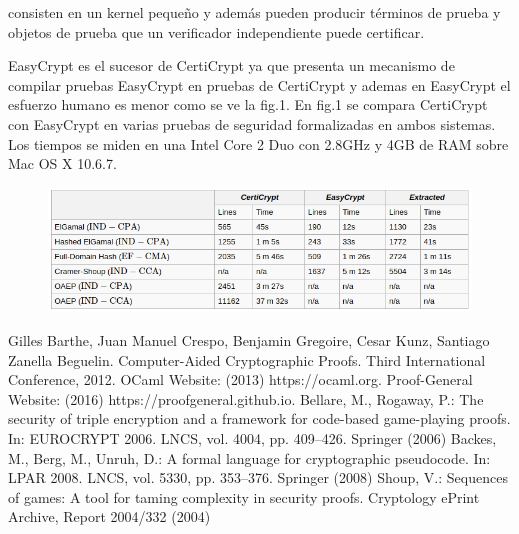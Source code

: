 \documentclass[runningheads]{llncs}
\begin{document}
consisten en un kernel pequeño y además pueden producir términos de prueba y objetos de prueba que un verificador independiente puede certificar.

EasyCrypt es el sucesor de CertiCrypt ya que presenta un mecanismo de compilar pruebas EasyCrypt en pruebas de CertiCrypt y ademas en EasyCrypt el esfuerzo humano es menor como se ve la fig.1. En fig.1 se compara CertiCrypt con EasyCrypt en varias pruebas de seguridad formalizadas en ambos sistemas. Los tiempos se miden en una Intel Core 2 Duo con 2.8GHz y 4GB de RAM sobre Mac OS X 10.6.7.
\begin{figure}
  \centering
  \includegraphics[width=.8\textwidth]{tabla_1}
  \caption{}
  \label{fig:simple}
\end{figure}
\begin{thebibliography}{8}
Gilles Barthe, Juan Manuel Crespo, Benjamin Gregoire, Cesar Kunz, Santiago Zanella Beguelin. Computer-Aided Cryptographic Proofs. Third International Conference, 2012.
OCaml Website: (2013) https://ocaml.org.
Proof-General Website: (2016) https://proofgeneral.github.io.
Bellare, M., Rogaway, P.: The security of triple encryption and a framework for
code-based game-playing proofs. In: EUROCRYPT 2006. LNCS, vol. 4004, pp.
409–426. Springer (2006)
Backes, M., Berg, M., Unruh, D.: A formal language for cryptographic pseudocode.
In: LPAR 2008. LNCS, vol. 5330, pp. 353–376. Springer (2008)
Shoup, V.: Sequences of games: A tool for taming complexity in security proofs.
Cryptology ePrint Archive, Report 2004/332 (2004)

\end{thebibliography}
\end{document}
